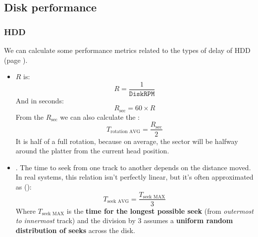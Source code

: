 \subsection{Disk performance}\label{subsection: Disk performance}

\subsubsection{HDD}\label{subsubsection: HDD performance}

We can calculate some performance metrics related to the types of delay of HDD (page \pageref{four types of hdd delay}).
\begin{itemize}
    \item {} $R$ is:
    \begin{equation}
        R = \dfrac{1}{\texttt{DiskRPM}}
    \end{equation}
    And in seconds:
    \begin{equation}
        R_{\text{sec}} = 60 \times R
    \end{equation}
    From the $R_{\text{sec}}$ we can also calculate the :
    \begin{equation}
        T_{\text{rotation AVG}} = \dfrac{R_{\text{sec}}}{2}
    \end{equation}
    It is half of a full rotation, because on average, the sector will be halfway around the platter from the current head position.

    \item \label{def: Seek Time} . The time to seek from one track to another depends on the distance moved. In real systems, this relation isn't perfectly linear, but it's often approximated as ():
    \begin{equation}
        T_{\text{seek AVG}} = \dfrac{T_{\text{seek MAX}}}{3}
    \end{equation}
    Where $T_{\text{seek MAX}}$ is the \textbf{time for the longest possible seek} (from \emph{outermost to innermost} track) and the division by 3 assumes a \textbf{uniform random distribution of seeks} across the disk.


\end{itemize}
